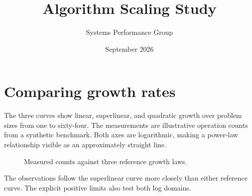 \documentclass{article}
\title{Algorithm Scaling Study}
\author{Systems Performance Group}
\date{September 2026}
\begin{document}
\maketitle

\section{Comparing growth rates}
The three curves show linear, superlinear, and quadratic growth over problem
sizes from one to sixty-four. The measurements are illustrative operation
counts from a synthetic benchmark. Both axes are logarithmic, making a
power-law relationship visible as an approximately straight line.

\begin{figure}
\centering
{}
\caption{Measured counts against three reference growth laws.}
\label{fig:scaling}
\end{figure}

The observations follow the superlinear curve more closely than either
reference curve. The explicit positive limits also test both log domains.
\end{document}
